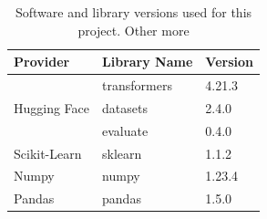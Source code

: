 \begin{table}[ht]
    \captionsetup{font=small}
    \small
    \centering
    \begin{tabularx}{\textwidth}{|X|X|X|}
        \hline
        \rowcolor[gray]{0.7}
        \multirow{-3}{*}{} \textbf{Provider} & \textbf{Library Name} & \textbf{Version} \\
        \hline
        \multirow{3}{*}{Hugging Face}        & transformers          & 4.21.3           \\
        \cline{2-3}
                                             & datasets              & 2.4.0            \\
        \cline{2-3}
                                             & evaluate              & 0.4.0            \\
        \hline
        Scikit-Learn                         & sklearn               & 1.1.2            \\
        \hline
        Numpy                                & numpy                 & 1.23.4           \\
        \hline
        Pandas                               & pandas                & 1.5.0            \\
        \hline
    \end{tabularx}
    \caption{Software and library versions used for this project. Other more }
    \label{tab: libs_used}
\end{table}

